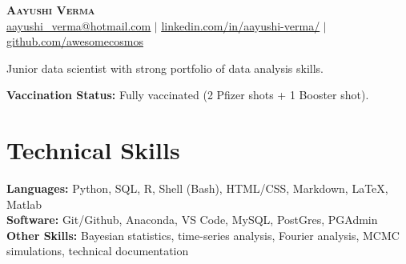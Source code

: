 \documentclass[letterpaper,11pt]{article}
\newcommand\orcidicon[1]{\href{https://orcid.org/#1}{\mbox{\scalerel*{
\begin{tikzpicture}[yscale=-1,transform shape]
\pic{orcidlogo};
\end{tikzpicture}
}{|}}}}
\begin{document}
\begin{center}
\textbf{\Huge \scshape Aayushi Verma \orcidicon{0000-0003-2396-4569}} \\ \vspace{10pt} 
\small \href{mailto:aayushi_verma@hotmail.com}{\underline{aayushi\_verma@hotmail.com}} $|$ 
\small \href{https://www.linkedin.com/in/aayushi-verma/}{\underline{linkedin.com/in/aayushi-verma/}} $|$ \href{https://github.com/awesomecosmos}{\underline{github.com/awesomecosmos}}  
\end{center}



Junior data scientist with strong portfolio of data analysis skills.


\textbf{Vaccination Status:} Fully vaccinated (2 Pfizer shots + 1 Booster shot).


\section{Technical Skills}
\textbf{Languages:} Python, SQL, R, Shell (Bash), HTML/CSS, Markdown, LaTeX,  Matlab\\ 
\textbf{Software:} Git/Github, Anaconda, VS Code, MySQL, PostGres, PGAdmin\\
\textbf{Other Skills:} Bayesian statistics, time-series analysis, Fourier analysis, MCMC simulations, technical documentation\\
\end{document}
